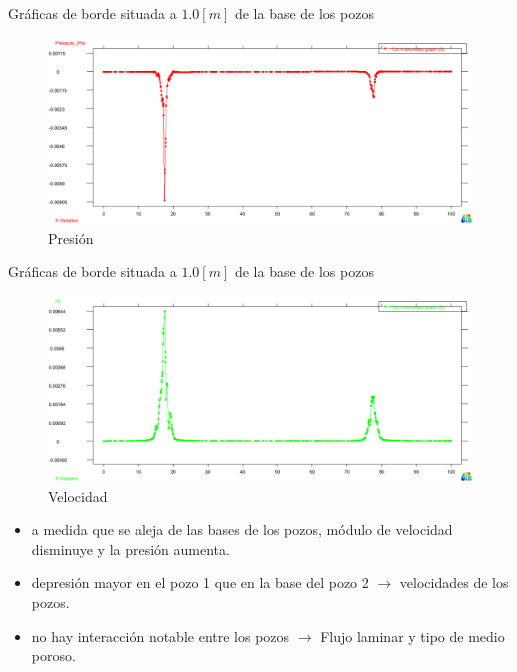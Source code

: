 \documentclass[spanish]{beamer}
\begin{document}
%
%
\begin{frame}{Gráficas de borde situada a $1.0[m]$ de la base de los pozos}
\begin{center}
\begin{figure}[htbp]
\centerline{\includegraphics[scale=0.25]{../img/100m/grf/100_grafico_presion_x_centro_pozos_distancia1}}
\caption{Presión}
\end{figure}
\end{center}
\end{frame}
%
%
\begin{frame}{Gráficas de borde situada a $1.0[m]$ de la base de los pozos}
\begin{center}
\begin{figure}[htbp]
\centerline{\includegraphics[scale=0.25]{../img/100m/grf/100_grafico_velocidad_x_centro_pozos_distancia1}}
\caption{Velocidad}
\end{figure}
\end{center}
\end{frame}
%
\begin{frame}
\begin{itemize}
\item a medida que se aleja de las bases de los pozos, módulo de velocidad disminuye y  la presión aumenta.
\item depresión mayor en el pozo 1 que en la base del pozo 2 $\rightarrow$ velocidades de los pozos.
\item no hay interacción notable entre los pozos $\rightarrow$ Flujo laminar y tipo de medio poroso.
\end{itemize}
\end{frame}
%
\end{document}
